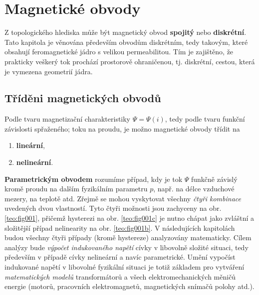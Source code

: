\setchaptertoc
\chapter{Magnetické obvody}\label{teo:IchapV}

  
  Z topologického hlediska může být magnetický obvod \textbf{spojitý} nebo \textbf{diskrétní}. Tato 
  kapitola je věnována především obvodům diskrétním, tedy takovým, které obsahují feromagnetické 
  jádro s velikou permeabilitou. Tím je zajištěno, že prakticky veškerý tok prochází prostorově 
  ohraničenou, tj. diskrétní, cestou, která je vymezena geometrií jádra.
  
  \section{Tříděni magnetických obvodů}\label{teo:IchapVsecI}
    Podle tvaru magnetizační charakteristiky \(\Psi=\Psi(i)\), tedy podle tvaru funkční závislosti 
    spřaženého; toku na proudu, je možno magnetické obvody třídit na
    \begin{enumerate}[noitemsep]
      \item \textbf{lineární},
      \item \textbf{nelineární}.
    \end{enumerate}
    
    \textbf{Parametrickým obvodem} rozumíme případ, kdy je tok \(\Psi\) funkčně závislý kromě 
    proudu na dalším fyzikálním parametru \(p\), např. na délce vzduchové mezery, na teplotě atd. 
    Zřejmě se mohou vyskytovat všechny \emph{čtyři kombinace} uvedených dvou vlastností. Tyto čtyři 
    možnosti jsou zachyceny na obr. \ref{teo:fig001}, přičemž hysterezi na obr. \ref{teo:fig001c} 
    je nutno chápat jako zvláštní a složitější případ nelinearity na obr. \ref{teo:fig001b}. V 
    následujících kapitolách budou všechny čtyři případy (kromě hystereze) analyzovány matematicky. 
    Cílem analýzy bude \emph{výpočet indukovaného napětí} cívky v libovolně složité situaci, tedy 
    především v případě cívky nelineární a navíc parametrické. Umění vypočíst indukované napětí v 
    libovolné fyzikální situaci je totiž základem pro vytváření \emph{matematických modelů} 
    transformátorů a všech elektromechanických měničů energie (motorů, pracovních elektromagnetů, 
    magnetických snímačů polohy atd.).
 
